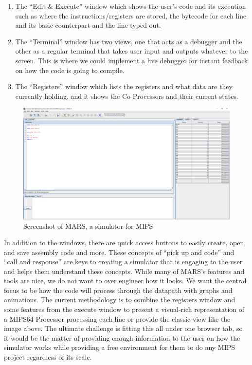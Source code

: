 \documentclass[
    paper=letter,
    parskip=half,
    fontsize=12pt,
    titlepage=firstiscover,
    toc=bibliography,
    numbers=endperiod
]{scrartcl}
\providecommand{\tightlist}{%
  \setlength{\itemsep}{0pt}\setlength{\parskip}{0pt}}
\begin{document}
\begin{enumerate}
    \tightlist
    \item The ``Edit \& Execute'' window which shows the user's code and its
        execution such as where the instructions/registers are stored, the
        bytecode for each line and its basic counterpart and the line typed out.
    \item The ``Terminal'' window has two views, one that acts as a debugger
        and the other as a regular terminal that takes user input and outputs
        whatever to the screen. This is where we could implement a live debugger
        for instant feedback on how the code is going to compile.
    \item The ``Registers'' window which lists the registers and what data are
        they currently holding, and it shows the Co-Processors and their current
        states.
\end{enumerate}

\begin{figure}[H]
    \includegraphics[width=\textwidth]{mars}
    \caption{Screenshot of MARS, a simulator for MIPS}
    \label{fig:mars}
\end{figure}

In addition to the windows, there are quick access buttons to easily
create, open, and save assembly code and more. These concepts of ``pick
up and code'' and ``call and response'' are keys to creating a simulator
that is engaging to the user and helps them understand these concepts.
While many of MARS's features and tools are nice, we do not want to over
engineer how it looks. We want the central focus to be how the code
will process through the datapath with graphs and animations. The
current methodology is to combine the registers window and some features
from the execute window to present a visual-rich representation of a
MIPS64 Processor processing each line or provide the classic view like
the image above. The ultimate challenge is fitting this all under one
browser tab, so it would be the matter of providing enough information
to the user on how the simulator works while providing a free
environment for them to do any MIPS project regardless of its scale.
\end{document}
